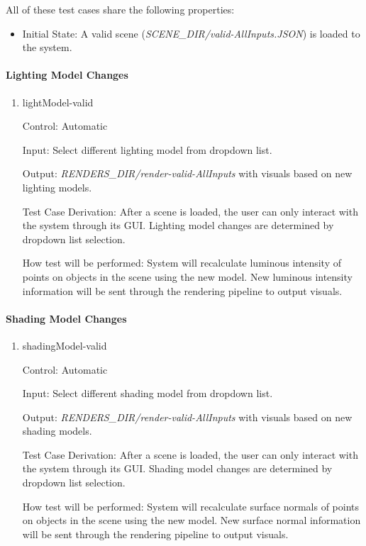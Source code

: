 \documentclass[12pt, titlepage]{article}
\begin{document}
All of these test cases share the following properties:
\begin{itemize}
	\item[] Initial State: A valid scene 
	(\textit{SCENE\_DIR/valid-AllInputs.JSON}) is loaded to the system.
\end{itemize}

\paragraph{Lighting Model Changes}

\begin{enumerate}
	
	\item{lightModel-valid\\}
	
	Control: Automatic
	
	Input: Select different lighting model from dropdown list.
	
	Output: \textit{RENDERS\_DIR/render-valid-AllInputs} with visuals based on 
	new lighting models.
	
	Test Case Derivation: After a scene is loaded, the user can only interact 
	with the system through its GUI. Lighting model changes are determined by 
	dropdown list selection.
	
	How test will be performed: System will recalculate luminous intensity of 
	points on objects in the scene using the new model. New luminous intensity 
	information will be sent through the rendering pipeline to output visuals.
	
\end{enumerate}

\paragraph{Shading Model Changes}

\begin{enumerate}
	
	\item{shadingModel-valid\\}
	
	Control: Automatic
	
	Input: Select different shading model from dropdown list.
	
	Output: \textit{RENDERS\_DIR/render-valid-AllInputs} with visuals based on 
	new shading models.
	
	Test Case Derivation: After a scene is loaded, the user can only interact 
	with the system through its GUI. Shading model changes are determined by 
	dropdown list selection.
	
	How test will be performed: System will recalculate surface normals of 
	points on objects in the scene using the new model. New surface normal
	information will be sent through the rendering pipeline to output visuals.
	
\end{enumerate}
\end{document}
